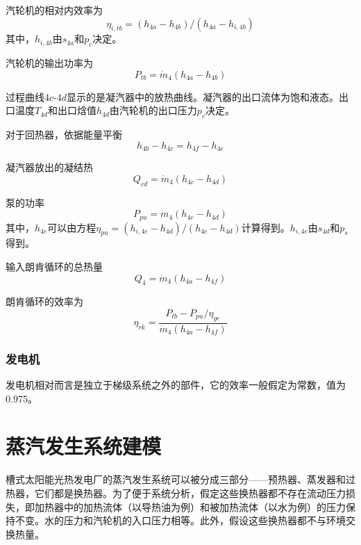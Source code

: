 汽轮机的相对内效率为
\begin{equation}
  \eta_{i,tb} = (h_{4a}-h_{4b})/(h_{4a}-h_{i,4b})
\end{equation}
其中，$h_{i,4b}$由$s_{4a}$和$p_c$决定。

汽轮机的输出功率为
\begin{equation}
  P_{tb}=\dot{m}_{4}(h_{4a}-h_{4b})
\end{equation}

过程曲线$4c$-$4d$显示的是凝汽器中的放热曲线。凝汽器的出口流体为饱和液态。出口温度$T_{4d}$和出口焓值$h_{4d}$由汽轮机的出口压力$p_c$决定。

对于回热器，依据能量平衡
\begin{equation}
  h_{4b} - h_{4c} = h_{4f} - h_{4e}
\end{equation}

凝汽器放出的凝结热
\begin{equation}
  Q_{cd} = \dot{m}_4 (h_{4c} - h_{4d})
\end{equation}

泵的功率
\begin{equation}
P_{pu}=\dot{m}_{4}(h_{4e}-h_{4d})
\end{equation}  
其中，$h_{4e}$可以由方程$\eta_{pu} = (h_{i,4e}-h_{4d})/(h_{4e}-h_{4d})$计算得到。$h_{i,4e}$由$s_{4d}$和$p_s$得到。
    
输入朗肯循环的总热量
\begin{equation}
    Q_4=\dot{m}_4(h_{4a}-h_{4f})
\end{equation}

朗肯循环的效率为
\begin{equation}
	\eta_{rk}=\dfrac{P_{tb}-P_{pu}/\eta_{ge}}{\dot{m}_4(h_{4a}-h_{4f})}
\end{equation}

\subsubsection{发电机}
发电机相对而言是独立于梯级系统之外的部件，它的效率一般假定为常数，值为0.975。

\section{蒸汽发生系统建模}
槽式太阳能光热发电厂的蒸汽发生系统可以被分成三部分——预热器、蒸发器和过热器，它们都是换热器。为了便于系统分析，假定这些换热器都不存在流动压力损失，即加热器中的加热流体（以导热油为例）和被加热流体（以水为例）的压力保持不变。水的压力和汽轮机的入口压力相等。此外，假设这些换热器都不与环境交换热量。

